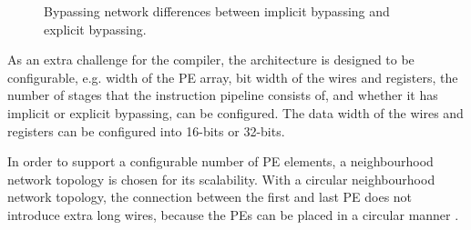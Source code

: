 \begin{figure}[b!]
\centering
{}
\hfil
{}
\caption{Bypassing network differences between implicit bypassing and explicit bypassing.}
\label{fig:datapath_approaches}
\end{figure}


As an extra challenge for the compiler, the architecture is designed to be configurable, e.g. width of the PE array, bit width of the wires and registers, the number of stages that the instruction pipeline consists of, and whether it has implicit or explicit bypassing, can be configured. The data width of the wires and registers can be configured into 16-bits or 32-bits.

In order to support a configurable number of PE elements, a neighbourhood network topology is chosen for its scalability. With a circular neighbourhood network topology, the connection between the first and last PE does not introduce extra long wires, because the PEs can be placed in a circular manner \cite{dongrio2}.

